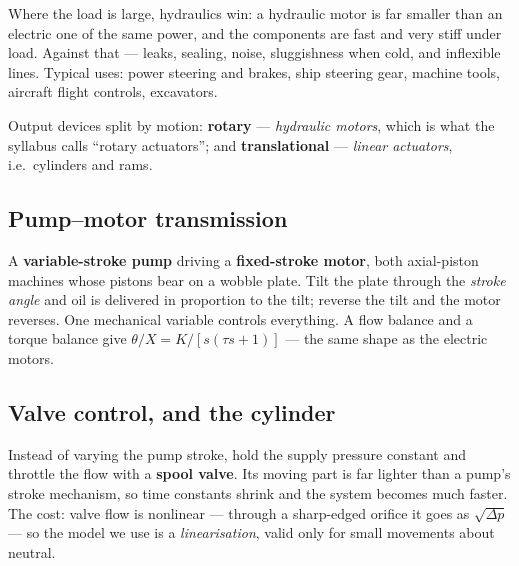 \documentclass[11pt,a4paper]{article}
\begin{document}
Where the load is large, hydraulics win: a hydraulic motor is far smaller than
an electric one of the same power, and the components are fast and very stiff
under load. Against that --- leaks, sealing, noise, sluggishness when cold, and
inflexible lines. Typical uses: power steering and brakes, ship steering gear,
machine tools, aircraft flight controls, excavators.

Output devices split by motion: \textbf{rotary} --- \emph{hydraulic motors},
which is what the syllabus calls ``rotary actuators''; and
\textbf{translational} --- \emph{linear actuators}, i.e.\ cylinders and rams.

\subsection*{Pump--motor transmission}

A \textbf{variable-stroke pump} driving a \textbf{fixed-stroke motor}, both
axial-piston machines whose pistons bear on a wobble plate. Tilt the plate
through the \emph{stroke angle} and oil is delivered in proportion to the tilt;
reverse the tilt and the motor reverses. One mechanical variable controls
everything. A flow balance and a torque balance give
$\theta/X = K/[s(\tau s+1)]$ --- the same shape as the electric motors.

\subsection*{Valve control, and the cylinder}

Instead of varying the pump stroke, hold the supply pressure constant and
throttle the flow with a \textbf{spool valve}. Its moving part is far lighter
than a pump's stroke mechanism, so time constants shrink and the system becomes
much faster. The cost: valve flow is nonlinear --- through a sharp-edged orifice
it goes as $\sqrt{\Delta p}$ --- so the model we use is a \emph{linearisation},
valid only for small movements about neutral.
\end{document}
